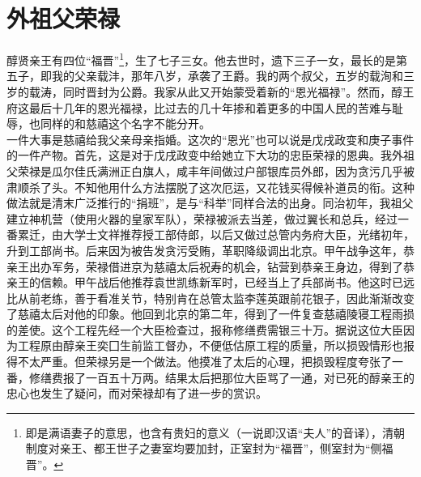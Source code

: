 \fancyhead[RO]{} %
\fancyhead[LE]{} %
\chapter*{外祖父荣禄}
\thispagestyle{empty}
醇贤亲王有四位“福晋”\footnote{即是满语妻子的意思，也含有贵妇的意义（一说即汉语“夫人”的音译），清朝制度对亲王、都王世子之妻室均要加封，正室封为“福晋”，侧室封为“侧福晋”。}，生了七子三女。他去世时，遗下三子一女，最长的是第五子，即我的父亲载沣，那年八岁，承袭了王爵。我的两个叔父，五岁的载洵和三岁的载涛，同时晋封为公爵。我家从此又开始蒙受着新的“恩光福禄”。然而，醇王府这最后十几年的恩光福禄，比过去的几十年掺和着更多的中国人民的苦难与耻辱，也同样的和慈禧这个名字不能分开。\\

  一件大事是慈禧给我父亲母亲指婚。这次的“恩光”也可以说是戊戌政变和庚子事件的一件产物。首先，这是对于戊戌政变中给她立下大功的忠臣荣禄的恩典。我外祖父荣禄是瓜尔佳氏满洲正白旗人，咸丰年间做过户部银库员外郎，因为贪污几乎被肃顺杀了头。不知他用什么方法摆脱了这次厄运，又花钱买得候补道员的衔。这种做法就是清末广泛推行的“捐班”，是与“科举”同样合法的出身。同治初年，我祖父建立神机营（使用火器的皇家军队），荣禄被派去当差，做过翼长和总兵，经过一番累迁，由大学士文祥推荐授工部侍郎，以后又做过总管内务府大臣，光绪初年，升到工部尚书。后来因为被告发贪污受贿，革职降级调出北京。甲午战争这年，恭亲王出办军务，荣禄借进京为慈禧太后祝寿的机会，钻营到恭亲王身边，得到了恭亲王的信赖。甲午战后他推荐袁世凯练新军时，已经当上了兵部尚书。他这时已远比从前老练，善于看准关节，特别肯在总管太监李莲英跟前花银子，因此渐渐改变了慈禧太后对他的印象。他回到北京的第二年，得到了一件复查慈禧陵寝工程雨损的差使。这个工程先经一个大臣检查过，报称修缮费需银三十万。据说这位大臣因为工程原由醇亲王奕囗生前监工督办，不便低估原工程的质量，所以损毁情形也报得不太严重。但荣禄另是一个做法。他摸准了太后的心理，把损毁程度夸张了一番，修缮费报了一百五十万两。结果太后把那位大臣骂了一通，对已死的醇亲王的忠心也发生了疑问，而对荣禄却有了进一步的赏识。\\

